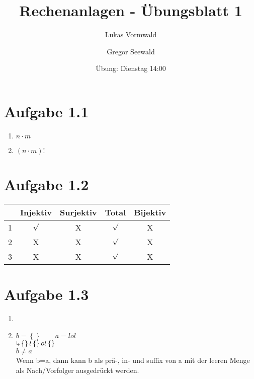 \documentclass[11pt,a4paper]{article}
\title{Rechenanlagen - Übungsblatt 1}
\author{Lukas Vormwald \and Gregor Seewald}
\date{Übung: Dienstag 14:00}
\begin{document}
\maketitle
	\section*{Aufgabe 1.1}
		\begin{enumerate}
			\item $n\cdot m$
			\item $\left( n \cdot m \right)!$
		\end{enumerate}
	\section*{Aufgabe 1.2}
	\begin{tabular}{|c|c|c|c|c|}
	\hline 
	 & Injektiv & Surjektiv & Total & Bijektiv \\ 
	\hline 
	1 & $\surd$ & X & $\surd$ & X \\ 
	\hline 
	2 & X & X & $\surd$ & X \\
	\hline
	3 & X & X & $\surd$ & X \\
	\hline  
	\end{tabular} 
	\section*{Aufgabe 1.3}
	\begin{enumerate}
		\item
		\item 	$b=\left\lbrace \right\rbrace \qquad a=lol$\\
				$\rotatebox[origin=c]{180}{$\Lsh$}  \left\lbrace\right\rbrace l\left\lbrace\right\rbrace ol\left\lbrace\right\rbrace$\\
				$b \neq a$\\
				Wenn b=a, dann kann b als prä-, in- und suffix von a mit der leeren Menge als Nach/Vorfolger ausgedrückt werden. 
	\end{enumerate}
\end{document}
